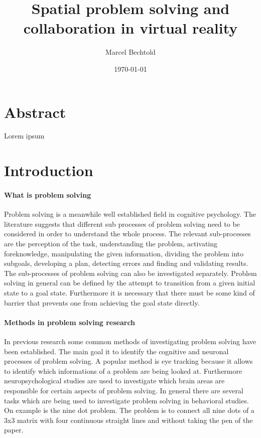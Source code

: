 \documentclass{article}
\title{Spatial problem solving and collaboration in virtual reality}
\author{Marcel Bechtold}
\date{\today}
\begin{document}
\maketitle


\section{Abstract}

Lorem ipsum

\section{Introduction}
\paragraph{What is problem solving}
Problem solving is a meanwhile well established field in cognitive psychology. The literature suggests that different sub processes of problem solving need to be considered in order to understand the whole process. The relevant sub-processes are the perception of the task, understanding the problem, activating foreknowledge, manipulating the given information, dividing the problem into subgoals, developing a plan, detecting errors and finding and validating results. The sub-processes of problem solving can also be investigated separately. Problem solving in general can be defined by the attempt to transition from a given initial state to a goal state. Furthermore it is necessary that there must be some kind of barrier that prevents one from achieving the goal state directly. \cite{muesseler2015allgemeine}

\paragraph{Methods in problem solving research}
In previous research some common methods of investigating problem solving have been established. The main goal it to identify the cognitive and neuronal processes of problem solving. A popular method is eye tracking because it allows to identify which informations of a problem are being looked at. \cite{underwood2005}  Furthermore neuropsychological studies are used to investigate which brain areas are responsible for certain aspects of problem solving. \cite{Karnath2006} In general there are several tasks which are being used to investigate problem solving in behavioral studies. On example is the nine dot problem. The problem is to connect all nine dots of a 3x3 matrix with four continuous straight lines and without taking the pen of the paper.
\end{document}
